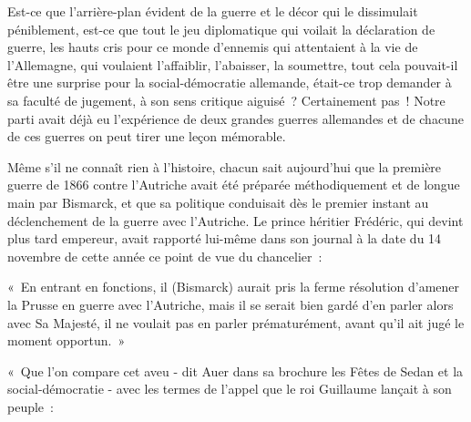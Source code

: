 \documentclass[french,twoside]{book} %
\newenvironment{quoteblock}%
  {\begin{quoting}}
  {\end{quoting}}
\newenvironment{quotebar}{%
    \def\FrameCommand{{\color{rubric!10!}\vrule width 0.5em} \hspace{0.9em}}%
    \def\OuterFrameSep{\itemsep} %
    \MakeFramed {\advance\hsize-\width \FrameRestore}
  }%
  {%
    \endMakeFramed
  }
\renewenvironment{quoteblock}%
  {%
    \savenotes
    \setstretch{0.9}
    \normalfont
    \begin{quotebar}
  }
  {%
    \end{quotebar}
    \spewnotes
  }
\begin{document}
Est-ce que l’arrière-plan évident de la guerre et le décor qui le dissimulait péniblement, est-ce que tout le jeu diplomatique qui voilait la déclaration de guerre, les hauts cris pour ce monde d’ennemis qui attentaient à la vie de l’Allemagne, qui voulaient l’affaiblir, l’abaisser, la soumettre, tout cela pouvait-il être une surprise pour la social-démocratie allemande, était-ce trop demander à sa faculté de jugement, à son sens critique aiguisé ? Certainement pas ! Notre parti avait déjà eu l’expérience de deux grandes guerres allemandes et de chacune de ces guerres on peut tirer une leçon mémorable.\par
Même s’il ne connaît rien à l’histoire, chacun sait aujourd’hui que la première guerre de 1866 contre l’Autriche avait été préparée méthodiquement et de longue main par Bismarck, et que sa politique conduisait dès le premier instant au déclenchement de la guerre avec l’Autriche. Le prince héritier Frédéric, qui devint plus tard empereur, avait rapporté lui-même dans son journal à la date du 14 novembre de cette année ce point de vue du chancelier :\par

\begin{quoteblock}
 \noindent « En entrant en fonctions, il (Bismarck) aurait pris la ferme résolution d’amener la Prusse en guerre avec l’Autriche, mais il se serait bien gardé d’en parler alors avec Sa Majesté, il ne voulait pas en parler prématurément, avant qu’il ait jugé le moment opportun. »
\end{quoteblock}

\noindent   « Que l’on compare cet aveu - dit Auer dans sa brochure les Fêtes de Sedan et la social-démocratie - avec les termes de l’appel que le roi Guillaume lançait à son peuple :\par
\end{document}
